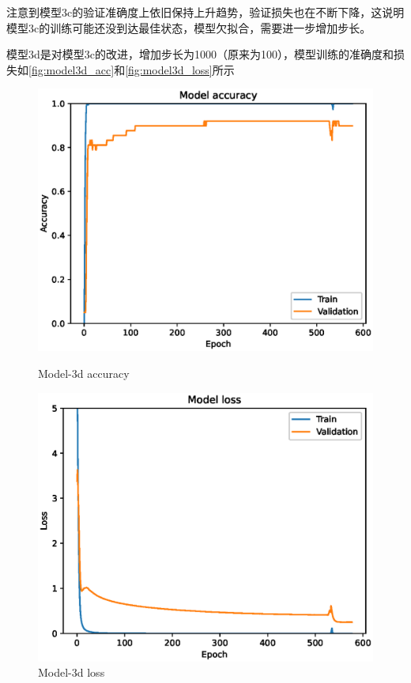注意到模型3c的验证准确度上依旧保持上升趋势，验证损失也在不断下降，这说明模型3c的训练可能还没到达最佳状态，模型欠拟合，需要进一步增加步长。

模型3d是对模型3c的改进，增加步长为1000（原来为100），模型训练的准确度和损失如\autoref{fig:model3d_acc}和\autoref{fig:model3d_loss}所示

\begin{figure}
        \centering
        \begin{minipage}{0.45\textwidth}
            \centering
            \includegraphics[width=\textwidth]{./fig/model3/accuracy3d.eps}
            \caption{Model-3d accuracy}
            \label{fig:model3d_acc}
        \end{minipage}
        \begin{minipage}{0.45\textwidth}
            \centering
            \includegraphics[width=\textwidth]{./fig/model3/loss3d.eps}
            \caption{Model-3d loss}
            \label{fig:model3d_loss}
        \end{minipage}
\end{figure}

